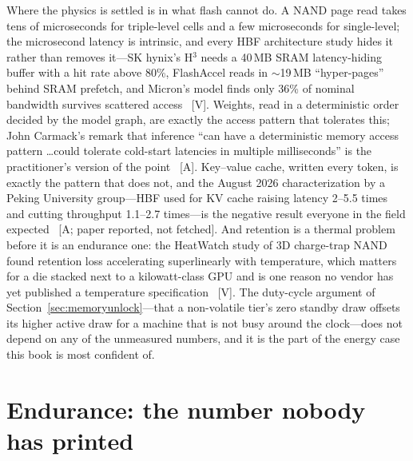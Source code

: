 Where the physics is settled is in what flash cannot do. A NAND page read takes tens of microseconds for triple-level cells and a few microseconds for single-level; the microsecond latency is intrinsic, and every HBF architecture study hides it rather than removes it---SK hynix's H$^3$ needs a 40\,MB SRAM latency-hiding buffer with a hit rate above 80\%, FlashAccel reads in $\sim$19\,MB ``hyper-pages'' behind SRAM prefetch, and Micron's model finds only 36\% of nominal bandwidth survives scattered access~\cite{hbf-h3,hbf-flashaccel,hbf-micron-hotinfra} [V]. Weights, read in a deterministic order decided by the model graph, are exactly the access pattern that tolerates this; John Carmack's remark that inference ``can have a deterministic memory access pattern \ldots could tolerate cold-start latencies in multiple milliseconds'' is the practitioner's version of the point~\cite{hbf-analysis} [A]. Key--value cache, written every token, is exactly the pattern that does not, and the August 2026 characterization by a Peking University group---HBF used for KV cache raising latency 2--5.5 times and cutting throughput 1.1--2.7 times---is the negative result everyone in the field expected~\cite{hbf-pku} [A; paper reported, not fetched]. And retention is a thermal problem before it is an endurance one: the HeatWatch study of 3D charge-trap NAND found retention loss accelerating superlinearly with temperature, which matters for a die stacked next to a kilowatt-class GPU and is one reason no vendor has yet published a temperature specification~\cite{hbf-heatwatch} [V]. The duty-cycle argument of Section~\ref{sec:memoryunlock}---that a non-volatile tier's zero standby draw offsets its higher active draw for a machine that is not busy around the clock---does not depend on any of the unmeasured numbers, and it is the part of the energy case this book is most confident of.

\section{Endurance: the number nobody has printed}

